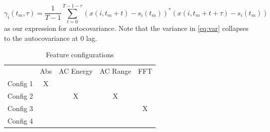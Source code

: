 \begin{equation}
	\gamma_i(t_m, \tau) = \frac{1}{T-1}\sum_{t=0}^{T-1- \tau}(x(i, t_m + t) - s_i(t_m))^*(x(i, t_m + t + \tau) - s_i(t_m))
\end{equation}
as our expression for autocovariance. Note that the variance in \ref{eq:var} collapses to the autocovariance at 0 lag. 



\begin{table}
\begin{center}
  \begin{tabular}{|c|cccc|}
\hline
    \rowcolor{blue!35}
                  & Abs & AC Energy & AC Range & FFT\\
    Config 1 & X & & & \\
    Config 2 &  & X & X&\\
    Config 3 & & & &X\\
    Config 4 & & & &\\
\hline
  \end{tabular}
\end{center}
\caption{Feature configurations}
\end{table}

